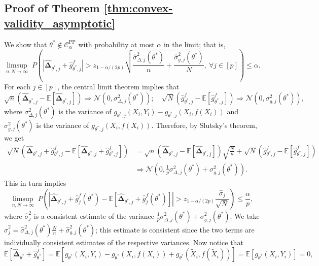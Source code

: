 \documentclass[10pt]{article}
\def\E{\mathbb{E}}
\newcommand{\Xt}{\widetilde{X}}
\newcommand{\rechat}{\hat{\mathbf{\Delta}}}
\newcommand{\CPP}{\mathcal{C}^{\mathrm{PP}}}
\begin{document}
\subsection{Proof of Theorem \ref{thm:convex-validity_asymptotic}}

We show that $\theta^*\not\in\CPP_\alpha$ with probability at most $\alpha$ in the limit; that is,
$$\limsup_{n,N\rightarrow\infty} \; P\left(\left|\rechat_{\theta^*,j} + \hat g^f_{\theta^*, j} \right|> z_{1-\alpha/(2p)}\sqrt{\frac{\hat\sigma^2_{\Delta,j}(\theta^*)}{n} + \frac{\hat\sigma^2_{g,j}(\theta^*)}{N}},~\forall j\in[p] \right) \leq \alpha.$$
For each $j\in[p]$, the central limit theorem implies that
$$\sqrt{n}(\rechat_{\theta^*,j} - \E[\rechat_{\theta^*,j}]) \Rightarrow \mathcal N(0,\sigma_{\Delta,j}^2(\theta^*));\quad \sqrt{N}(\hat g^f_{\theta^*, j} - \E[\hat g^f_{\theta^*, j}]) \Rightarrow \mathcal N(0,\sigma_{g,j}^2(\theta^*)),$$
where $\sigma_{\Delta,j}^2(\theta^*)$ is the variance of $g_{\theta^*,j}(X_i,Y_i) - g_{\theta^*,j}(X_i,f(X_i))$ and $\sigma_{g,j}^2(\theta^*)$ is the variance of $g_{\theta^*,j}(X_i,f(X_i))$. Therefore, by Slutsky's theorem, we get
\begin{align*}
\sqrt{N}(\rechat_{\theta^*,j} + \hat g^f_{\theta^*, j} - \E[\rechat_{\theta^*,j} + \hat g^f_{\theta^*, j}]) &= \sqrt{n}(\rechat_{\theta^*,j} - \E[\rechat_{\theta^*,j}])\sqrt{\frac{N}{n}} + \sqrt{N}( \hat g^f_{\theta^*, j} - \E[\hat g^f_{\theta^*, j}])\\
&\Rightarrow \mathcal N\left(0,\frac{1}{p}\sigma_{\Delta,j}^2(\theta^*)+\sigma_{g,j}^2(\theta^*)\right).
\end{align*}
This in turn implies
\begin{equation}
\label{eq:clt-implication}
\limsup_{n,N\rightarrow\infty} \; P\left(\left|\rechat_{\theta^*,j} + \hat g_j^f(\theta^*) - \E\left[\rechat_{\theta^*,j} + \hat g_j^f(\theta^*)\right] \right|> z_{1-\alpha/(2p)} \frac{\hat\sigma_j}{\sqrt{N}} \right) \leq \frac{\alpha}{p},
\end{equation}
where $\hat\sigma_j^2$ is a consistent estimate of the variance $\frac{1}{p}\sigma_{\Delta,j}^2(\theta^*)+\sigma_{g,j}^2(\theta^*)$. We take $\hat\sigma_j^2 = \hat\sigma_{\Delta,j}^2(\theta^*)\frac{N}{n} + \hat\sigma_{g,j}^2(\theta^*)$; this estimate is consistent since the two terms are individually consistent estimates of the respective variances.
Now notice that
\begin{equation}
\label{eq:grad0}
\E\left[\rechat_{\theta^*} + \hat g^f_{\theta^*}\right] = \E\left[g_{\theta^*}(X_i,Y_i)-g_{\theta^*}(X_i,f(X_i)) + g_{\theta^*}(\Xt_i,f(\Xt_i))\right] = \E[g_{\theta^*}(X_i,Y_i)] = 0,
\end{equation}
\end{document}
